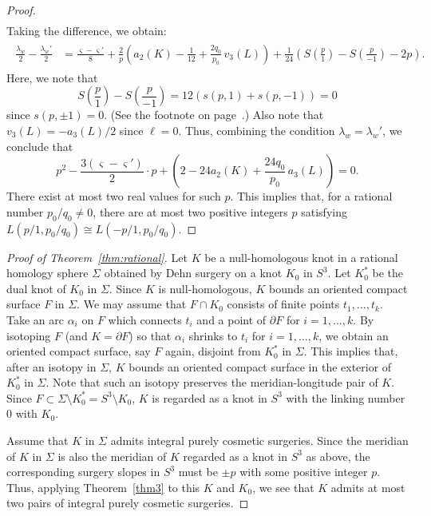 \documentclass{amsart}
\theoremstyle{remark}
\begin{document}
\begin{proof}
\begin{align*}
\end{align*}
Taking the difference, we obtain: 
\begin{align*}
    \begin{split}
    \frac{\lambda_w}{2} - \frac{\lambda_w'}{2} 
    &= \frac{\varsigma - \varsigma'}{8} 
     +\frac{2}{p} \left( a_2(K) - \frac{1}{12} + \frac{ 2 q_0}{p_0} \,v_3(L) \right) 
     + \frac{1}{24} \left( S\left( \frac{p}{1} \right) - S\left( \frac{p}{-1} \right) - 2 p \right). 
    \end{split}
\end{align*}    
Here, we note that 
\[
S\left(\frac{p}{1}\right) - S\left(\frac{p}{-1}\right) = 12 (s(p,1) + s(p,-1)) = 0 \] 
since $s(p,\pm1) =0$. (See the footnote on page~\pageref{ft}.)
Also note that $v_3(L) = -a_3(L)/2$ since $\ell = 0$. 
Thus, combining the condition $\lambda_w = \lambda_w'$, we conclude that
\begin{equation}\label{eq:RHS1}
p^2 - \frac{3(\varsigma - \varsigma')}{2}\cdot p  + \left( 2 - 24 a_2(K) + \frac{24  q_0}{p_0} \,a_3(L) \right) =0.  
\end{equation}
There exist at most two real values for such $p$. 
This implies that, for a rational number $p_0/q_0 \ne 0$, there are at most two positive integers $p$ satisfying $L(p/1,p_0/q_0) \cong L(-p/1, p_0/q_0)$.
\end{proof}

\begin{proof}[Proof of Theorem~\ref{thm:rational}]
Let $K$ be a null-homologous knot in a rational homology sphere $\Sigma$ obtained by Dehn surgery on a knot $K_0$ in $S^3$. 
Let $K_0^*$ be the dual knot of $K_0$ in $\Sigma$. 
Since $K$ is null-homologous, $K$ bounds an oriented compact surface $F$ in $\Sigma$. 
We may assume that $F \cap K_0$ consists of finite points $t_1, \dots, t_k$. 
Take an arc $\alpha_i$ on $F$ which connects $t_i$ and a point of $\partial F$ for $i=1,\dots,k$. 
By isotoping $F$ (and $K = \partial F$) so that $\alpha_i$ shrinks to $t_i$ for $i=1,\dots,k$, we obtain an oriented compact surface, say $F$ again, disjoint from $K_0^*$ in $\Sigma$. 
This implies that, after an isotopy in $\Sigma$, $K$ bounds an oriented compact surface in the exterior of $K_0^*$ in $\Sigma$. 
Note that such an isotopy preserves the meridian-longitude pair of $K$. 
Since $F \subset \Sigma \setminus K_0^* = S^3 \setminus K_0$, $K$ is regarded as a knot in $S^3$ with the linking number $0$ with $K_0$. 

Assume that $K$ in $\Sigma$ admits integral purely cosmetic surgeries. 
Since the meridian of $K$ in $\Sigma$ is also the meridian of $K$ regarded as a knot in $S^3$ as above, the corresponding surgery slopes in $S^3$ must be $\pm p$ with some positive integer $p$. 
Thus, applying Theorem~\ref{thm3} to this $K$ and $K_0$, we see that $K$ admits at most two pairs of integral purely cosmetic surgeries. 
\end{proof}
\end{document}
